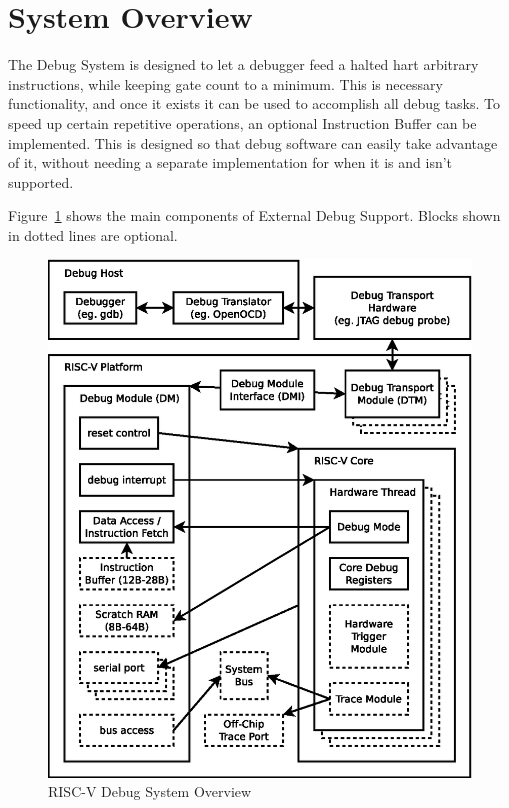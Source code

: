 \documentclass{article}
\begin{document}
\section{System Overview}

The Debug System is designed to let a debugger feed a halted hart arbitrary
instructions, while keeping gate count to a minimum. This is necessary
functionality, and once it exists it can be used to accomplish all debug tasks.
To speed up certain repetitive operations, an optional Instruction Buffer can
be implemented. This is designed so that debug software can easily take
advantage of it, without needing a separate implementation for when it is and
isn't supported.

Figure~\ref{fig:overview} shows the main components of External Debug Support.
Blocks shown in dotted lines are optional.

\begin{figure}
   \centering
   \includegraphics[width=\textwidth]{overview.eps}
   \caption{RISC-V Debug System Overview}
   \label{fig:overview}
\end{figure}
\end{document}

